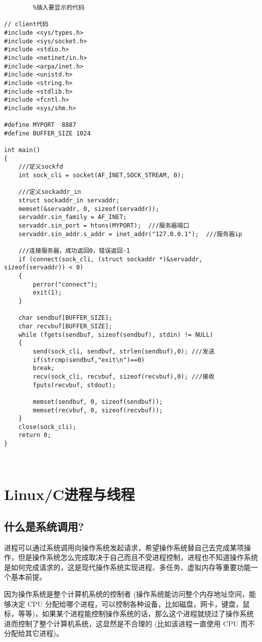 \documentclass[utf8]{book}
\begin{document}
\lstset{language=C}
{\setmainfont{Courier New Bold}   
	\begin{lstlisting}        %插入要显示的代码
	
// client代码		
#include <sys/types.h>
#include <sys/socket.h>
#include <stdio.h>
#include <netinet/in.h>
#include <arpa/inet.h>
#include <unistd.h>
#include <string.h>
#include <stdlib.h>
#include <fcntl.h>
#include <sys/shm.h>

#define MYPORT  8887
#define BUFFER_SIZE 1024

int main()
{
	///定义sockfd
	int sock_cli = socket(AF_INET,SOCK_STREAM, 0);

	///定义sockaddr_in
	struct sockaddr_in servaddr;
	memset(&servaddr, 0, sizeof(servaddr));
	servaddr.sin_family = AF_INET;
	servaddr.sin_port = htons(MYPORT);  ///服务器端口
	servaddr.sin_addr.s_addr = inet_addr("127.0.0.1");  ///服务器ip
	
	///连接服务器，成功返回0，错误返回-1
	if (connect(sock_cli, (struct sockaddr *)&servaddr, sizeof(servaddr)) < 0)
	{
		perror("connect");
		exit(1);
	}
	
	char sendbuf[BUFFER_SIZE];
	char recvbuf[BUFFER_SIZE];
	while (fgets(sendbuf, sizeof(sendbuf), stdin) != NULL)
	{
		send(sock_cli, sendbuf, strlen(sendbuf),0); ///发送
		if(strcmp(sendbuf,"exit\n")==0)
		break;
		recv(sock_cli, recvbuf, sizeof(recvbuf),0); ///接收
		fputs(recvbuf, stdout);
		
		memset(sendbuf, 0, sizeof(sendbuf));
		memset(recvbuf, 0, sizeof(recvbuf));
	}
	close(sock_cli);
	return 0;
}

	
	\end{lstlisting}}

	\chapter{Linux/C进程与线程}
	
	\section{什么是系统调用?}
	
	进程可以通过系统调用向操作系统发起请求，希望操作系统替自己去完成某项操作，但是操作系统怎么完成取决于自己而且不受进程控制，进程也不知道操作系统是如何完成请求的，这是现代操作系统实现进程、多任务、虚拟内存等重要功能一个基本前提。
	
	因为操作系统是整个计算机系统的控制者 (操作系统能访问整个内存地址空间，能够决定 CPU 分配给哪个进程，可以控制各种设备，比如磁盘，网卡，键盘，鼠标，等等)，如果某个进程能控制操作系统的话，那么这个进程就绕过了操作系统进而控制了整个计算机系统，这显然是不合理的 (比如该进程一直使用 CPU 而不分配给其它进程)。
	
\end{document}
